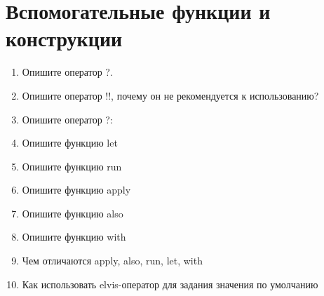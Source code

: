 \documentclass[12pt]{article}
\begin{document}
\section*{Вспомогательные функции и конструкции}
\begin{enumerate}
  \item Опишите оператор ?.
  \item Опишите оператор !!, почему он не рекомендуется к использованию?
  \item Опишите оператор ?:
  \item Опишите функцию let
  \item Опишите функцию run
  \item Опишите функцию apply
  \item Опишите функцию also
  \item Опишите функцию with
  \item Чем отличаются apply, also, run, let, with
  \item Как использовать elvis-оператор для задания значения по умолчанию
\end{enumerate}
\end{document}
